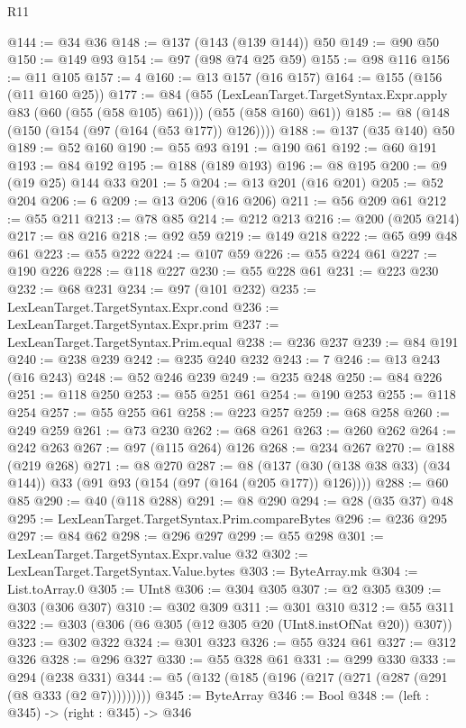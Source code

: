 \begin{lexlean}{R11}
\begin{coremodule}
@144 := @34 @36
@148 := @137 (@143 (@139 @144)) @50
@149 := @90 @50
@150 := @149 @93
@154 := @97 (@98 @74 @25 @59)
@155 := @98 @116
@156 := @11 @105
@157 := 4
@160 := @13 @157 (@16 @157)
@164 := @155 (@156 (@11 @160 @25))
@177 := @84
    (@55
      (LexLeanTarget.TargetSyntax.Expr.apply @83 (@60 (@55 (@58 @105) @61)))
      (@55 (@58 @160) @61))
@185 := @8 (@148 (@150 (@154 (@97 (@164 (@53 @177)) @126))))
@188 := @137 (@35 @140) @50
@189 := @52 @160
@190 := @55 @93
@191 := @190 @61
@192 := @60 @191
@193 := @84 @192
@195 := @188 (@189 @193)
@196 := @8 @195
@200 := @9 (@19 @25) @144 @33
@201 := 5
@204 := @13 @201 (@16 @201)
@205 := @52 @204
@206 := 6
@209 := @13 @206 (@16 @206)
@211 := @56 @209 @61
@212 := @55 @211
@213 := @78 @85
@214 := @212 @213
@216 := @200 (@205 @214)
@217 := @8 @216
@218 := @92 @59
@219 := @149 @218
@222 := @65 @99 @48 @61
@223 := @55 @222
@224 := @107 @59
@226 := @55 @224 @61
@227 := @190 @226
@228 := @118 @227
@230 := @55 @228 @61
@231 := @223 @230
@232 := @68 @231
@234 := @97 (@101 @232)
@235 := LexLeanTarget.TargetSyntax.Expr.cond
@236 := LexLeanTarget.TargetSyntax.Expr.prim
@237 := LexLeanTarget.TargetSyntax.Prim.equal
@238 := @236 @237
@239 := @84 @191
@240 := @238 @239
@242 := @235 @240 @232
@243 := 7
@246 := @13 @243 (@16 @243)
@248 := @52 @246 @239
@249 := @235 @248
@250 := @84 @226
@251 := @118 @250
@253 := @55 @251 @61
@254 := @190 @253
@255 := @118 @254
@257 := @55 @255 @61
@258 := @223 @257
@259 := @68 @258
@260 := @249 @259
@261 := @73 @230
@262 := @68 @261
@263 := @260 @262
@264 := @242 @263
@267 := @97 (@115 @264) @126
@268 := @234 @267
@270 := @188 (@219 @268)
@271 := @8 @270
@287 := @8 (@137 (@30 (@138 @38 @33) (@34 @144)) @33 (@91 @93 (@154 (@97 (@164 (@205 @177)) @126))))
@288 := @60 @85
@290 := @40 (@118 @288)
@291 := @8 @290
@294 := @28 (@35 @37) @48
@295 := LexLeanTarget.TargetSyntax.Prim.compareBytes
@296 := @236 @295
@297 := @84 @62
@298 := @296 @297
@299 := @55 @298
@301 := LexLeanTarget.TargetSyntax.Expr.value @32
@302 := LexLeanTarget.TargetSyntax.Value.bytes
@303 := ByteArray.mk
@304 := List.toArray.{0}
@305 := UInt8
@306 := @304 @305
@307 := @2 @305
@309 := @303 (@306 @307)
@310 := @302 @309
@311 := @301 @310
@312 := @55 @311
@322 := @303 (@306 (@6 @305 (@12 @305 @20 (UInt8.instOfNat @20)) @307))
@323 := @302 @322
@324 := @301 @323
@326 := @55 @324 @61
@327 := @312 @326
@328 := @296 @327
@330 := @55 @328 @61
@331 := @299 @330
@333 := @294 (@238 @331)
@344 := @5 (@132 (@185 (@196 (@217 (@271 (@287 (@291 (@8 @333 (@2 @7)))))))))
@345 := ByteArray
@346 := Bool
@348 := (left : @345) -> (right : @345) -> @346

\end{coremodule}
\end{lexlean}
